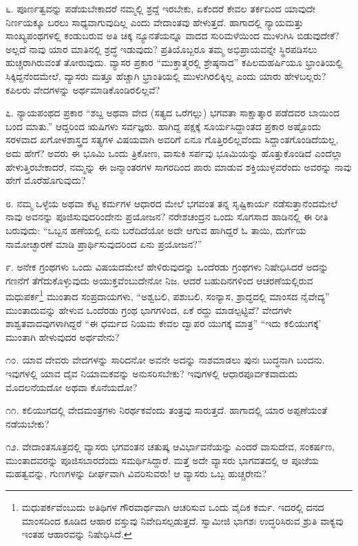 ೬. ಪೂರ್ಣತ್ವವನ್ನು ಪಡೆಯಬೇಕಾದರೆ ನಮ್ಮಲ್ಲಿ ಶ್ರದ್ದೆ ಇರಬೇಕು, ಏಕೆಂದರೆ ಕೇವಲ ತರ್ಕದಿಂದ ಯಾವುದೇ ನಿರ್ಣಯಕ್ಕೂ ಬರಲು ಸಾಧ್ಯವಾಗುವುದಿಲ್ಲ ಎಂದು ವೇದಾಂತವು ಹೇಳುತ್ತದೆ. ಹಾಗಾದಲ್ಲಿ ನ್ಯಾಯಮತ್ತು ಸಾಂಖ್ಯಪಂಥಗಳಲ್ಲಿ ಕಂಡುಬರುವ ಅತಿ ಚಿಕ್ಕ ನ್ಯೂನತೆಯನ್ನೂ ವಾದದ ಸುರಿಮಳೆಯಿಂದ ಮುಳುಗಿಸಿ ಬಿಡುವುದೇಕೆ? ಅಲ್ಲದೆ ನಾವು ಯಾರ ಮಾತಿನಲ್ಲಿ ಶ್ರದ್ಧೆ ಇಡುವುದು? ಪ್ರತಿಯೊಬ್ಬರೂ ತಮ್ಮ ಅಭಿಪ್ರಾಯವನ್ನೇ ಸ್ಥಿರಪಡಿಸಲು ಹುಚ್ಚರಾಗಿರುವಂತೆ ತೋರುವುದು. ವ್ಯಾಸರ ಪ್ರಕಾರ “ಮುಕ್ತಾತ್ಮರಲ್ಲಿ ಶ್ರೇಷ್ಠನಾದ” ಕಪಿಲಮಹರ್ಷಿಯೂ ಭ್ರಾಂತಿಯಲ್ಲಿ ಸಿಕ್ಕಿದ್ದನೆಂದಮೇಲೆ, ವ್ಯಾಸರು ಮತ್ತೂ ಹೆಚ್ಚಾಗಿ ಭ್ರಾಂತಿಯಲ್ಲಿ ಮುಳುಗಿರಲಿಕ್ಕಿಲ್ಲ ಎಂದು ಯಾರು ಹೇಳಬಲ್ಲರು? ಕಪಿಲರು ವೇದಗಳನ್ನು ಅರ್ಥಮಾಡಿಕೊಂಡಿರಲಿಲ್ಲವೆ?

೭. ನ್ಯಾಯಪಂಥದ ಪ್ರಕಾರ “ಶಬ್ದ ಅಥವಾ ವೇದ (ಸತ್ಯದ ಒರೆಗಲ್ಲು) ಭಗವತಾ ಸಾಕ್ಷಾತ್ಕಾರ ಪಡೆದವರ ಬಾಯಿಂದ ಬಂದ ಮಾತು.” ಆದ್ದರಿಂದ ಋಷಿಗಳು ಸರ್ವಜ್ಞರು. ಹಾಗಿದ್ದ ಪಕ್ಷಕ್ಕೆ ಸೂರ್ಯಸಿದ್ದಾಂತದ ಪ್ರಕಾರ ಅಷ್ಟೊಂದು ಸರಳವಾದ ಖಗೋಳಶಾಸ್ತ್ರದ ಸತ್ಯಗಳ ವಿಷಯವಾಗಿ ಅವರಿಗೆ ಏನೂ ಗೊತ್ತಿರಲಿಲ್ಲವೆಂದು ಸಿದ್ದಾಂತಗೊಂಡಿದೆಯಲ್ಲ, ಅದು ಹೇಗೆ? ಅವರು ಈ ಭೂಮಿ ಒಂದು ತ್ರಿಕೋಣ, ವಾಸುಕಿ ಸರ್ಪವು ಭೂಮಿಯನ್ನು ಹೊತ್ತುಕೊಂಡಿದೆ ಎಂದೆಲ್ಲಾ ಹೇಳುತ್ತಿರಬೇಕಾದರೆ, ನಮ್ಮನ್ನು ಈ ಜನ್ಮಾಂತರಗಳ ಸಾಗರ\break ದಿಂದ ಪಾರು ಮಾಡುವ ಶಕ್ತಿಯುಳ್ಳವರೆಂದು ಅವರನ್ನು ನಾವು ಹೇಗೆ ಮೊರೆಹೊಗುವುದು?

೮. ನಮ್ಮ ಒಳ್ಳೆಯ ಅಥವಾ ಕೆಟ್ಟ ಕರ್ಮಗಳ ಆಧಾರದ ಮೇಲೆ ಭಗವಂತ ತನ್ನ ಸೃಷ್ಟಿಕಾರ್ಯ ನಡೆಸುತ್ತಾನೆಂದಮೇಲೆ ನಾವು ಅವನನ್ನು ಪೂಜಿಸುವುದರಿಂದೇನು ಪ್ರಯೋಜನ? ನರೇಶಚಂದ್ರನ ಒಂದು ಸೊಗಸಾದ ಹಾಡಿನಲ್ಲಿ ಈ ರೀತಿ ಬರುವುದು: “ಒಬ್ಬನ ಹಣೆಯಲ್ಲಿ ಏನು ಬರೆದಿದೆಯೋ ಅದೇ ಆಗುವ ಹಾಗಿದ್ದರೆ ಓ ತಾಯಿ, ದುರ್ಗೆಯ ನಾಮೋಚ್ಛಾರಣೆ ಮಾಡಿ ಪ್ರಾರ್ಥಿಸುವುದರಿಂದ ಏನು ಪ್ರಯೋಜನ?”

೯. ಅನೇಕ ಗ್ರಂಥಗಳು ಒಂದು ವಿಷಯದಮೇಲೆ ಹೇಳಿರುವುದನ್ನು ಒಂದೆರಡು ಗ್ರಂಥಗಳು ನಿಷೇಧಿಸಿದರೆ ಅದನ್ನು ಗಣನೆಗೆ ತೆಗೆದುಕೊಳ್ಳುವುದು ಅಯುಕ್ತವೆಂಬುದೇನೋ ನಿಜ. ಆದರೆ ಬಹುದಿನಗಳಿಂದ ಆಚರಣೆಯಲ್ಲಿರುವ ಮಧುಪರ್ಕ\footnote{ಮಧುಪರ್ಕವೆಂಬುದು ಅತಿಥಿಗಳ ಗೌರವಾರ್ಥವಾಗಿ ಆಚರಿಸುವ ಒಂದು ವೈದಿಕ ಕರ್ಮ. ಇದರಲ್ಲಿ ದನದ ಮಾಂಸದಿಂದ ಕೂಡಿದ ಆಹಾರ ವಸ್ತುವು ನಿವೇದಿಸಲ್ಪಡುತ್ತದೆ. ಸ್ವಾಮೀಜಿ ಭಾಗಶಃ ಉದ್ಧರಿಸಿರುವ ಶ್ರುತಿ ವಾಕ್ಯವು ಇಂತಹ ಆಹಾರವನ್ನು ನಿಷೇಧಿಸಿದೆ.} ಮುಂತಾದ ಸಂಪ್ರದಾಯಗಳು, ``ಅಶ್ವಬಲಿ, ಪಶುಬಲಿ, ಸಂನ್ಯಾಸ, ಶ್ರಾದ್ಧದಲ್ಲಿ ಮಾಂಸದ ನೈವೇದ್ಯ” \enginline{-} ಮುಂತಾದುವನ್ನು ಹೇಳುವ ಒಂದೆರಡು ಗ್ರಂಥ ಭಾಗಗಳಿಂದ, ಏಕೆ ರದ್ದು ಮಾಡಲ್ಪಟ್ಟಿವೆ? ವೇದಗಳೇ ಶಾಶ್ವತವಾದವುಗಳಾಗಿದ್ದರೆ ``ಈ ಧರ್ಮದ ನಿಯಮ ಕೇವಲ ದ್ವಾಪರ ಯುಗಕ್ಕೆ ಮಾತ್ರ” “ಇದು ಕಲಿಯುಗಕ್ಕೆ' ಮುಂತಾಗಿ ಹೇಳುವುದರ ಅರ್ಥವೇನು?

೧೦. ಯಾವ ದೇವರು ವೇದಗಳನ್ನು ಸಾರಿದನೋ ಅವನೇ ಅದನ್ನು ನಾಶ\break ಮಾಡಲು ಪುನಃ ಬುದ್ಧನಾಗಿ ಬಂದನು. ಇವುಗಳಲ್ಲಿ ಯಾವ ದೈವ ನಿಯಾಮಕವನ್ನು ಅನುಸರಿಸಬೇಕು? ಇವುಗಳಲ್ಲಿ ಆಧಾರಪೂರ್ವಕವಾದುದು ಮೊದಲನೆಯದೋ ಅಥವಾ ಕೊನೆಯದೋ?

೧೧. ಕಲಿಯುಗದಲ್ಲಿ ವೇದಮಂತ್ರಗಳು ನಿರರ್ಥಕವೆಂದು ತಂತ್ರವು ಸಾರುತ್ತದೆ. ಹಾಗಾದಲ್ಲಿ ಯಾರ ಅಪ್ಪಣೆಯಂತೆ ನಡೆಯಬೇಕು?

೧೨. ವೇದಾಂತಸೂತ್ರದಲ್ಲಿ ವ್ಯಾಸರು ಭಗವಂತನ ಚತುಷ್ಕ ಆವಿರ್ಭಾವನೆಯನ್ನು ಎಂದರೆ ವಾಸುದೇವ, ಸಂಕರ್ಷಣ, ಮುಂತಾದವರನ್ನು ಪೂಜಿಸಬಾರದೆಂದು ಸಮರ್ಥಿಸಿದ್ದಾರೆ. ಮತ್ತೆ ಅದೇ ವ್ಯಾಸರು ಭಾಗವತದಲ್ಲಿ ಆ ಪೂಜೆಯ ಮಹತ್ವವನ್ನು, ಗುಣಗಳನ್ನು ದೀರ್ಘವಾಗಿ ವಿವರಿಸುವರು! ಆ ವ್ಯಾಸರು ಒಬ್ಬ ಹುಚ್ಚರೇನು?

